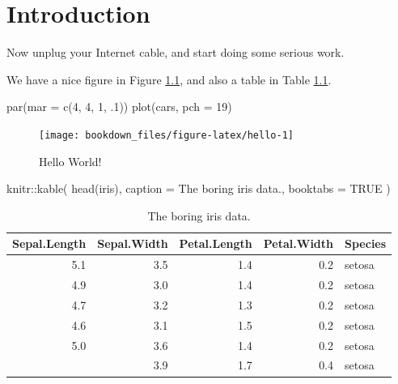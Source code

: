 \documentclass[
]{krantz}
\makeatletter
\newenvironment{Shaded}{\begin{snugshade}}{\end{snugshade}}
\newcommand{\AttributeTok}[1]{\textcolor[rgb]{0.61,0.61,0.61}{#1}}
\newcommand{\ConstantTok}[1]{\textcolor[rgb]{0,0,0}{#1}}
\newcommand{\DecValTok}[1]{\textcolor[rgb]{0.06,0.06,0.06}{#1}}
\newcommand{\FunctionTok}[1]{\textcolor[rgb]{0,0,0}{#1}}
\newcommand{\NormalTok}[1]{#1}
\newcommand{\SpecialCharTok}[1]{\textcolor[rgb]{0,0,0}{#1}}
\newcommand{\StringTok}[1]{\textcolor[rgb]{0.5,0.5,0.5}{#1}}
\newenvironment{kframe}{%
\medskip{}
\setlength{\fboxsep}{.8em}
 \def\at@end@of@kframe{}%
 \ifinner\ifhmode%
  \def\at@end@of@kframe{\end{minipage}}%
  \begin{minipage}{\columnwidth}%
 \fi\fi%
 \def\FrameCommand##1{\hskip\@totalleftmargin \hskip-\fboxsep
 \colorbox{shadecolor}{##1}\hskip-\fboxsep
     \hskip-\linewidth \hskip-\@totalleftmargin \hskip\columnwidth}%
 \MakeFramed {\advance\hsize-\width
   \@totalleftmargin\z@ \linewidth\hsize
   \@setminipage}}%
 {\par\unskip\endMakeFramed%
 \at@end@of@kframe}
\renewenvironment{Shaded}{\begin{kframe}}{\end{kframe}}
\makeatother
\begin{document}
\mainmatter

\hypertarget{introduction}{%
\chapter{Introduction}\label{introduction}}

Now unplug your Internet cable, and start doing some serious work.

We have a nice figure in Figure \ref{fig:hello}, and also a table in Table \ref{tab:iris}.

\begin{Shaded}
\begin{Highlighting}[]
\FunctionTok{par}\NormalTok{(}\AttributeTok{mar =} \FunctionTok{c}\NormalTok{(}\DecValTok{4}\NormalTok{, }\DecValTok{4}\NormalTok{, }\DecValTok{1}\NormalTok{, .}\DecValTok{1}\NormalTok{))}
\FunctionTok{plot}\NormalTok{(cars, }\AttributeTok{pch =} \DecValTok{19}\NormalTok{)}
\end{Highlighting}
\end{Shaded}

\begin{figure}
\texttt{[image: bookdown\_files/figure-latex/hello-1]} \caption{Hello World!}\label{fig:hello}
\end{figure}

\begin{Shaded}
\begin{Highlighting}[]
\NormalTok{knitr}\SpecialCharTok{::}\FunctionTok{kable}\NormalTok{(}
  \FunctionTok{head}\NormalTok{(iris), }\AttributeTok{caption =} \StringTok{\textquotesingle{}The boring iris data.\textquotesingle{}}\NormalTok{,}
  \AttributeTok{booktabs =} \ConstantTok{TRUE}
\NormalTok{)}
\end{Highlighting}
\end{Shaded}

\begin{table}

\caption{\label{tab:iris}The boring iris data.}
\centering
\begin{tabular}[t]{rrrrl}
\toprule
Sepal.Length & Sepal.Width & Petal.Length & Petal.Width & Species\\
\midrule
5.1 & 3.5 & 1.4 & 0.2 & setosa\\
4.9 & 3.0 & 1.4 & 0.2 & setosa\\
4.7 & 3.2 & 1.3 & 0.2 & setosa\\
4.6 & 3.1 & 1.5 & 0.2 & setosa\\
5.0 & 3.6 & 1.4 & 0.2 & setosa\\
\addlinespace
5.4 & 3.9 & 1.7 & 0.4 & setosa\\
\bottomrule
\end{tabular}
\end{table}
\end{document}
